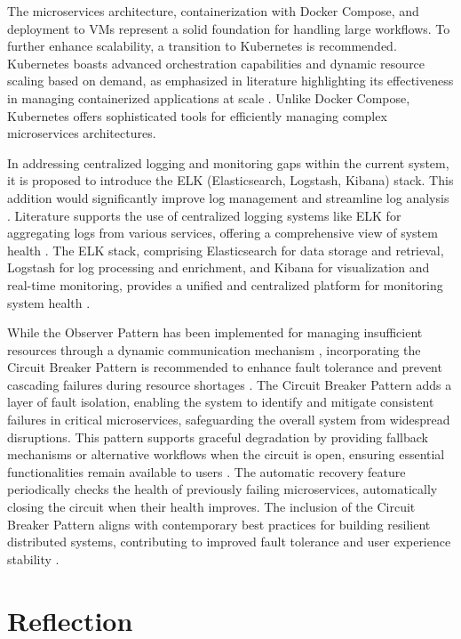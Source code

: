 \documentclass[conference, onecolumn]{IEEEtran}
\begin{document}
The microservices architecture, containerization with Docker Compose, and deployment to VMs represent a solid foundation for handling large workflows. To further enhance scalability, a transition to Kubernetes is recommended. Kubernetes boasts advanced orchestration capabilities and dynamic resource scaling based on demand, as emphasized in literature highlighting its effectiveness in managing containerized applications at scale \cite{Beda2017}\cite{MNO2019}. Unlike Docker Compose, Kubernetes offers sophisticated tools for efficiently managing complex microservices architectures.

In addressing centralized logging and monitoring gaps within the current system, it is proposed to introduce the ELK (Elasticsearch, Logstash, Kibana) stack. This addition would significantly improve log management and streamline log analysis \cite{Gormley2015}. Literature supports the use of centralized logging systems like ELK for aggregating logs from various services, offering a comprehensive view of system health \cite{Gormley2015}. The ELK stack, comprising Elasticsearch for data storage and retrieval, Logstash for log processing and enrichment, and Kibana for visualization and real-time monitoring, provides a unified and centralized platform for monitoring system health \cite{Gormley2015}.

While the Observer Pattern has been implemented for managing insufficient resources through a dynamic communication mechanism \cite{GhoshND}, incorporating the Circuit Breaker Pattern is recommended to enhance fault tolerance and prevent cascading failures during resource shortages \cite{Fowler2014}. The Circuit Breaker Pattern adds a layer of fault isolation, enabling the system to identify and mitigate consistent failures in critical microservices, safeguarding the overall system from widespread disruptions. This pattern supports graceful degradation by providing fallback mechanisms or alternative workflows when the circuit is open, ensuring essential functionalities remain available to users \cite{Nygard2017}. The automatic recovery feature periodically checks the health of previously failing microservices, automatically closing the circuit when their health improves. The inclusion of the Circuit Breaker Pattern aligns with contemporary best practices for building resilient distributed systems, contributing to improved fault tolerance and user experience stability \cite{SharmaND}.

\section{Reflection}
\end{document}
